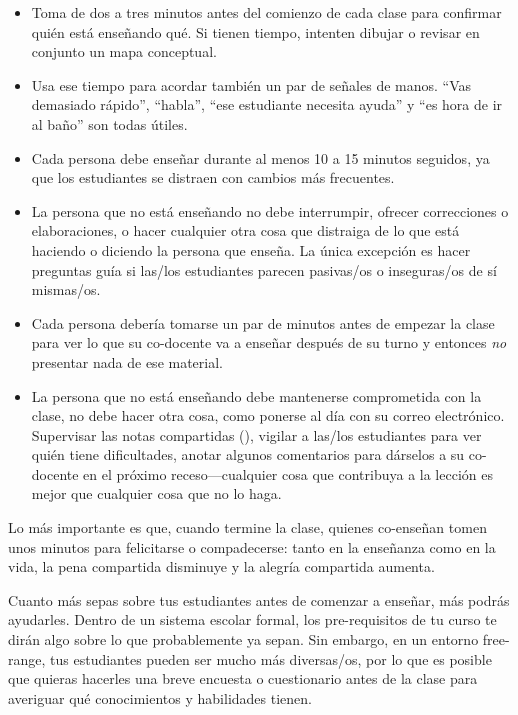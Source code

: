 \begin{itemize}

\item
  Toma de dos a tres minutos antes del comienzo de cada clase
  para confirmar quién está enseñando qué.
  Si tienen tiempo,
  intenten dibujar o revisar en conjunto un mapa conceptual.

\item
  Usa ese tiempo para acordar también un par de señales de manos.
  ``Vas demasiado rápido'',
  ``habla'',
  ``ese estudiante necesita ayuda''
  y ``es hora de ir al baño'' son todas útiles.

\item
  Cada persona debe enseñar durante al menos 10 a 15 minutos seguidos,
  ya que los estudiantes se distraen con cambios más frecuentes.

\item
  La persona que no está enseñando no debe interrumpir,
  ofrecer correcciones o elaboraciones,
  o hacer cualquier otra cosa que distraiga de lo que está haciendo o diciendo la persona que enseña.
  La única excepción es hacer preguntas guía
  si las/los estudiantes parecen pasivas/os o inseguras/os de sí mismas/os.
 
\item
  Cada persona debería tomarse un par de minutos antes de empezar la clase
  para ver lo que su co-docente va a enseñar después de su turno
  y entonces \emph{no} presentar nada de ese material.

\item
  La persona que no está enseñando debe mantenerse comprometida con la clase,
  no debe hacer otra cosa, como ponerse al día con su correo electrónico.
  Supervisar las notas compartidas (),
  vigilar a las/los estudiantes para ver quién tiene dificultades,
  anotar algunos comentarios para dárselos a su co-docente en el próximo receso---cualquier
  cosa que contribuya a la lección es mejor que cualquier cosa que no lo haga.
 
\end{itemize}

Lo más importante es que,
cuando termine la clase, quienes co-enseñan tomen unos minutos para felicitarse o compadecerse:
tanto en la enseñanza como en la vida,
la pena compartida disminuye y la alegría compartida aumenta.


Cuanto más sepas sobre tus estudiantes antes de comenzar a enseñar,
más podrás ayudarles.
Dentro de un sistema escolar formal,
los pre-requisitos de tu curso te dirán algo sobre
lo que probablemente ya sepan.
Sin embargo,
en un entorno free-range,
tus estudiantes pueden ser mucho más diversas/os,
por lo que es posible que quieras hacerles una breve encuesta o cuestionario antes de la clase
para averiguar qué conocimientos y habilidades tienen.

